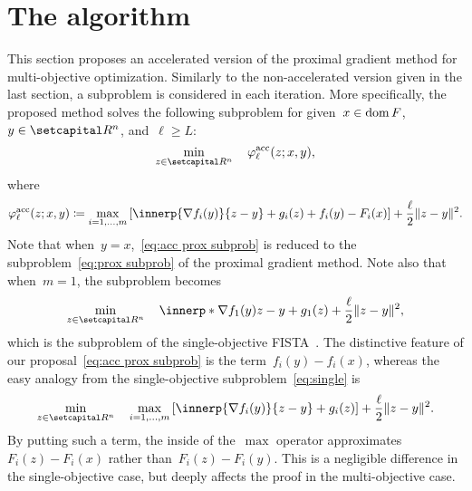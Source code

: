 \documentclass[../main]{subfiles}
\begin{document}
\section{The algorithm} \label{sec:acc_pgm:algorithm}
This section proposes an accelerated version of the proximal gradient method for multi-objective optimization.
Similarly to the non-accelerated version given in the last section, a subproblem is considered in each iteration.
More specifically, the proposed method solves the following subproblem for given~$x \in \operatorname{dom} F$,~$y \in \setR^n$, and~$\ell \ge L$:
\[ \label{eq:acc prox subprob}
    \min_{z \in \setR^n} \quad \varphi^\acc_\ell(z; x, y) 
,\]
where
\[ \label{eq:varphi acc}
    \varphi^\acc_\ell(z; x, y) \coloneqq \max_{i = 1, \dots, m} \left[ \innerp{\nabla f_i(y)}{z - y} + g_i(z) + f_i(y) - F_i(x) \right] + \frac{\ell}{2} \norm{z - y}^2
.\]
Note that when~$y = x$,~\cref{eq:acc prox subprob} is reduced to the subproblem~\cref{eq:prox subprob} of the proximal gradient method.
Note also that when~$m = 1$, the subproblem becomes
\[ \label{eq:single}
    \min_{z \in \setR^n} \quad \innerp*{\nabla f_1(y)}{z - y} + g_1(z) + \frac{\ell}{2} \norm{z - y}^2
,\]
which is the subproblem of the single-objective FISTA~\cite{Beck2009}.
The distinctive feature of our proposal~\cref{eq:acc prox subprob} is the term~$f_i(y) - f_i(x)$, whereas the easy analogy from the single-objective subproblem~\cref{eq:single} is
\[
    \min_{z \in \setR^n} \quad \max_{i = 1, \dots, m} \left[ \innerp{\nabla f_i(y)}{z - y} + g_i(z) \right] + \frac{\ell}{2} \norm{z - y}^2
.\] 
By putting such a term, the inside of the~$\max$ operator approximates~$F_i(z) - F_i(x)$ rather than~$F_i(z) - F_i(y)$.
This is a negligible difference in the single-objective case, but deeply affects the proof in the multi-objective case.
\end{document}
